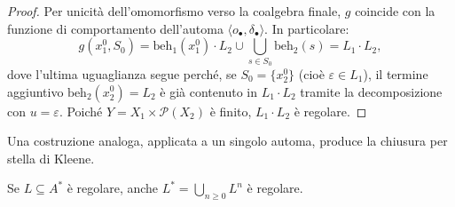 \begin{proof}
  Per unicità dell'omomorfismo verso la coalgebra finale, \(g\) coincide con la funzione di comportamento dell'automa \(\langle o_\bullet, \delta_\bullet \rangle\). In particolare:
  \[
    g(x_1^0, S_0) = \mathrm{beh}_1(x_1^0) \cdot L_2 \cup \bigcup_{s \in S_0} \mathrm{beh}_2(s) = L_1 \cdot L_2,
  \]
  dove l'ultima uguaglianza segue perché, se \(S_0 = \{x_2^0\}\) (cioè \(\varepsilon \in L_1\)), il termine aggiuntivo \(\mathrm{beh}_2(x_2^0) = L_2\) è già contenuto in \(L_1 \cdot L_2\) tramite la decomposizione con \(u = \varepsilon\). Poiché \(Y = X_1 \times \mathcal{P}(X_2)\) è finito, \(L_1 \cdot L_2\) è regolare.
\end{proof}

Una costruzione analoga, applicata a un singolo automa, produce la chiusura per stella di Kleene.

\begin{proposition}
  Se \(L \subseteq A^*\) è regolare, anche \(L^* = \bigcup_{n \geq 0} L^n\) è regolare.
\end{proposition}

